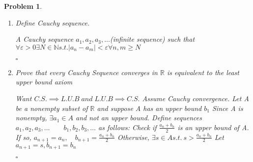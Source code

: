 \documentclass[a4paper]{article}
\newtheorem{prob}{\large{\large{Problem}}}
\newenvironment{sol}{\noindent{\large{\bf Solution:}}}{\hfill\ensuremath{\square}}
\def\bN{\mathbb N}
\def\bR{\mathbb R}
\def\imp{\ensuremath{\implies}}
\def\nl{\newline}
\def\bs{\backslash}
\def\ns{\varnothing}
\begin{document}
\begin{prob}
{\begin{enumerate}[(a.)]
\begin{sol}
{\begin{center}
\end{center}
i.e. $\exists$ an infinite sequence $x_1,x_2,x_3,\dots$ of points of A, distinct from p, that converge to p, with $\lim\limits_{j\to\infty}x_j=p$ 
but all $x_j\in A$, hence $p\in A$ also
\nl Hence A contains all of its accumulation points
\nl A is closed $\imp$ it contains all of its accumulation points.
\nl$\Leftarrow$
Now assume A contains all of its accumulation points, then choose $p \in \bR\bs A,$ so p is not an accumulation point of A.
\nl So by definition of accumulation points, $\exists \delta>0$ s.t. $\{x \in A\:|\: 0 < |x-p| < \delta\}=\ns$
\nl Hence there exists an open ball about p in $\bR\bs A$, so $\bR\bs A$ is open,$\imp A$ is closed
\nl So A is closed $\iff$ it contains all of its accumulation points, as required.}
\end{sol}
\item Define Cauchy sequence.
 \nl\begin{sol}
\large{ 
A Cauchy sequence $a_1,a_2,a_3,\dots$\quad (infinite sequence) such that $\forall \varepsilon>0\exists N\in \bN s.t. |a_n-a_m|<\varepsilon \forall n,m\geq N$

}
\end{sol}
\item Prove that every Cauchy Sequence converges in $\bR$ is equivalent to the least upper bound axiom
 \nl\begin{sol}
\large{ 
Want $C.S.\imp L.U.B\; and\; L.U.B\imp C.S.$
Assume Cauchy convergence.
\nl Let A be a nonempty subset of $\bR$ and suppose A has an upper bound $b_1$
\nl Since A is nonempty, $\exists a_1 \in A$ and not an upper bound.
\nl Define sequences $a_1,a_2,a_3,\dots \qquad b_1,b_2,b_3,\dots$ as follows:
\nl Check if $\frac{a_n+b_n}{2}$ is an upper bound of A.
\nl If so, $a_{n+1}=a_n,\quad b_{n+1}=\frac{a_n+b_n}{2}$
\nl Otherwise, $\exists s\in A s.t. \ s>\frac{a_n+b_n}{2}$
\nl Let $a_{n+1}=s, b_{n+1}=b_n$
\begin{center}
\end{center}}
\end{sol}
\end{enumerate}}
\end{prob}
\end{document}
